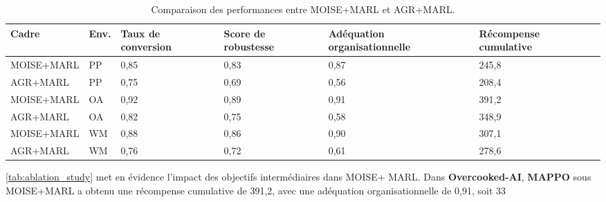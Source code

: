 \begin{table}[h!]
    \centering
    \caption{Comparaison des performances entre MOISE+MARL et AGR+MARL.}
    \label{tab:ablation_study}
    \small
    \renewcommand{\arraystretch}{1.1}
    \begin{tabular}{p{2cm}p{0.5cm}p{0.6cm}p{1.3cm}p{0.6cm}p{1.3cm}}
        \hline
        \textbf{Cadre} & \textbf{Env.} & \textbf{Taux de conversion} & \textbf{Score de robustesse} & \textbf{Adéquation organisationnelle} & \textbf{Récompense cumulative} \\ \hline
        MOISE+MARL     & PP            & 0,85                        & 0,83                         & 0,87                                  & 245,8                          \\
        AGR+MARL       & PP            & 0,75                        & 0,69                         & 0,56                                  & 208,4                          \\
        MOISE+MARL     & OA            & 0,92                        & 0,89                         & 0,91                                  & 391,2                          \\
        AGR+MARL       & OA            & 0,82                        & 0,75                         & 0,58                                  & 348,9                          \\
        MOISE+MARL     & WM            & 0,88                        & 0,86                         & 0,90                                  & 307,1                          \\
        AGR+MARL       & WM            & 0,76                        & 0,72                         & 0,61                                  & 278,6                          \\ \hline
    \end{tabular}
\end{table}

\noindent \autoref{tab:ablation_study} met en évidence l'impact des objectifs intermédiaires dans MOISE+ MARL. Dans \textbf{Overcooked-AI}, \textbf{MAPPO} sous MOISE+MARL a obtenu une récompense cumulative de 391,2, avec une adéquation organisationnelle de 0,91, soit 33 %


